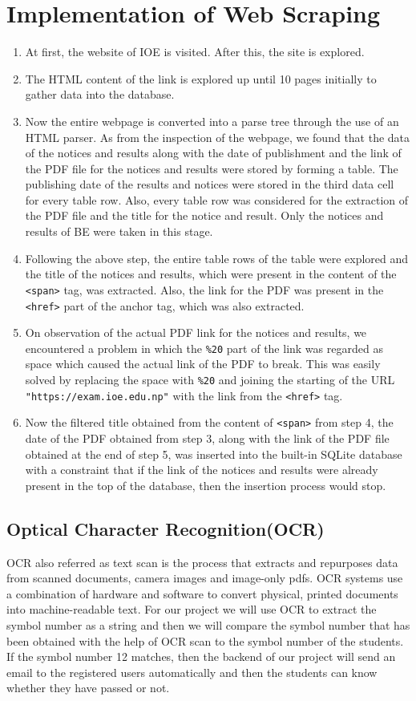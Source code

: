 \section*{Implementation of Web Scraping}
\begin{enumerate}
\item At first, the website of IOE is visited. After this, the site is explored.
\item The HTML content of the link is explored up until 10 pages initially to gather data into the database.
\item Now the entire webpage is converted into a parse tree through the use of an HTML parser. As from the inspection of the webpage, we found that the data of the notices and results along with the date of publishment and the link of the PDF file for the notices and results were stored by forming a table. The publishing date of the results and notices were stored in the third data cell for every table row. Also, every table row was considered for the extraction of the PDF file and the title for the notice and result. Only the notices and results of BE were taken in this stage.
\item Following the above step, the entire table rows of the table were explored and the title of the notices and results, which were present in the content of the \verb|<span>| tag, was extracted. Also, the link for the PDF was present in the \verb|<href>| part of the anchor tag, which was also extracted.
\item On observation of the actual PDF link for the notices and results, we encountered a problem in which the \verb|%20| part of the link was regarded as space which caused the actual link of the PDF to break. This was easily solved by replacing the space with \verb|%20| and joining the starting of the URL \verb|"https://exam.ioe.edu.np"| with the link from the \verb|<href>| tag.
\item Now the filtered title obtained from the content of \verb|<span>| from step 4, the date of the PDF obtained from step 3, along with the link of the PDF file obtained at the end of step 5, was inserted into the built-in SQLite database with a constraint that if the link of the notices and results were already present in the top of the database, then the insertion process would stop.
\end{enumerate}
\subsection*{Optical Character Recognition(OCR)}
OCR also referred as text scan is the process that extracts and repurposes data from 
scanned documents, camera images and image-only pdfs. OCR systems use a 
combination of hardware and software to convert physical, printed documents into 
machine-readable text. For our project we will use OCR to extract the symbol number 
as a string and then we will compare the symbol number that has been obtained with 
the help of OCR scan to the symbol number of the students. If the symbol number 
12
matches, then the backend of our project will send an email to the registered users 
automatically and then the students can know whether they have passed or not.

